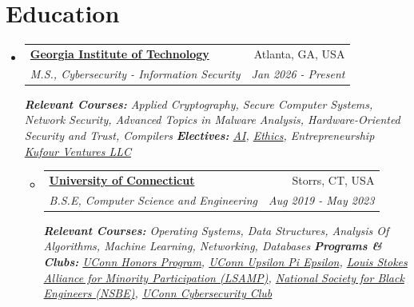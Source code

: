 \documentclass[a4paper,11pt]{article}
\makeatletter
\newcommand{\resumeSubheading}[4]{
  \vspace{-1pt}\item
    \begin{tabular*}{0.97\textwidth}{l@{\extracolsep{\fill}}r}
      \textbf{#1} & #2 \\
      \textit{#3} & \textit{#4} \\
    \end{tabular*}\vspace{-5pt}
}
\newcommand{\resumeSubHeadingListStart}{\begin{itemize}[leftmargin=*]}
\makeatother
\begin{document}
\section{Education}
\vspace{5pt}
  \begin{itemize}[leftmargin=0pt, label={}]  %
    \resumeSubheading
      {\href{https://www.gatech.edu/}{Georgia Institute of Technology}}{Atlanta, GA, USA}
      {M.S., Cybersecurity - Information Security}{Jan 2026 - Present}
      \vspace{5pt}
      {\scriptsize \textit{ \footnotesize{\newline{}\textbf{Relevant Courses:} Applied Cryptography, Secure Computer Systems, Network Security, Advanced Topics in Malware Analysis, Hardware-Oriented Security and Trust, Compilers}}}
      \vspace{2pt}
     {\scriptsize \textit{ \footnotesize{\newline{}\textbf{Electives:} \href{https://www.nature.com/articles/nature16961}{AI}, \href{https://link.springer.com/journal/11569}{Ethics}, Entrepreneurship  \href{https://service.ct.gov/business/s/onlinebusinesssearch?businessNameEn=Kufour} {Kufour Ventures LLC}}}}
      \vspace{2pt}
  \begin{itemize}[leftmargin=0pt, label={}]  %
    \resumeSubheading
      {\href{https://uconn.edu/}{University of Connecticut}}{Storrs, CT, USA}
      {B.S.E, Computer Science and Engineering}{Aug 2019 - May 2023}
      \vspace{5pt}
      {\scriptsize \textit{ \footnotesize{\newline{}\textbf{Relevant Courses:} Operating Systems, Data Structures, Analysis Of Algorithms, Machine Learning, Networking, Databases}}}
      {\scriptsize \textit{ \footnotesize{\newline{}\textbf{Programs \& Clubs:}
  \href{https://honors.uconn.edu/}{UConn Honors Program}, \href{https://github.com/UConn-UPE}{UConn Upsilon Pi Epsilon}, \href{https://www.nsf.gov/funding/opportunities/lsamp-louis-stokes-alliances-minority-participation}{Louis Stokes Alliance for Minority Participation (LSAMP)}, \href{https://nsbe.org/}{National Society for Black Engineers (NSBE)}, \href{https://uconntact.uconn.edu/organization/uconncyber}{UConn Cybersecurity Club}}}}
  \end{itemize}
  \end{itemize}
\end{document}

